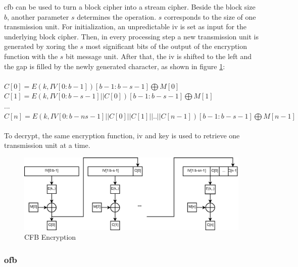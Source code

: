 \gls{cfb} can be used to turn a block cipher into a stream cipher. Beside the block size $b$, another parameter $s$ determines the operation. $s$ corresponds
to the size of one transmission unit. For initialization, an unpredictable \gls{iv} is set as input for the underlying block cipher. Then, in every
processing step a new transmission unit is generated by \gls{xor}ing the $s$ most significant bits
of the output of the encryption function with the $s$ bit message unit. After that, the \gls{iv} is shifted to the left and the gap is filled
by the newly generated character, as shown in figure \ref{fig:cfb}:
\\
\\
 $C[0] = E(k, IV[0:b-1])[b-1:b-s-1] \bigoplus M[0]$\\
 $C[1] = E(k, IV[0:b-s-1] || C[0])[b-1:b-s-1] \bigoplus M[1]$\\
 ... \\
 $C[n] = E(k, IV[0:b-ns-1] || C[0] || C[1] || .. || C[n-1])[b-1:b-s-1] \bigoplus M[n-1]$\\
\\

To decrypt, the same encryption function, \gls{iv} and key is used to retrieve one transmission unit at a time.
 
\begin{figure}
    \centering
    \includegraphics[width=1\textwidth]{figures/CFB.eps}
    \caption{CFB Encryption}
    \label{fig:cfb}
\end{figure}

\subsubsection{\gls{ofb}}

